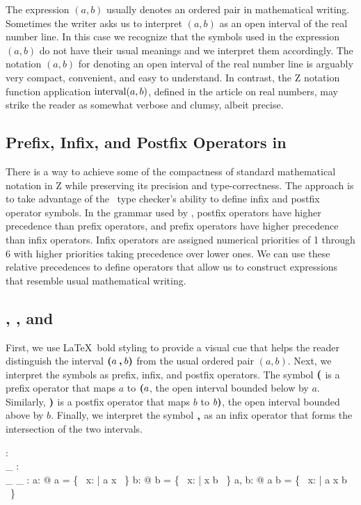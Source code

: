 \documentclass[11pt, oneside]{article}
\begin{document}
The expression $(a,b)$ usually denotes an ordered pair in mathematical writing.
Sometimes the writer asks us to interpret $(a,b)$ as an open interval of the real number line.
In this case we recognize that the symbols used in the expression $(a,b)$ do not have their usual meanings
and we interpret them accordingly.
The notation $(a,b)$ for denoting an open interval of the real number line is
arguably very compact, convenient, and easy to understand. 
In contrast, the Z notation function application $\operatorname{interval}(a,b)$, defined in the article on real numbers, 
may strike the reader as somewhat verbose and clumsy, albeit precise.

\subsection{Prefix, Infix, and Postfix Operators in \fuzz}

There is a way to achieve some of the compactness of standard mathematical notation in Z while
preserving its precision and type-correctness.
The approach is to take advantage of the \fuzz\ type checker's ability to define infix and postfix 
operator symbols. 
In the grammar used by \fuzz, postfix operators have higher precedence than prefix operators,
and prefix operators have higher precedence than infix operators.
Infix operators are assigned numerical priorities of 1 through 6 with higher priorities taking precedence 
over lower ones.
We can use these relative precedences to define operators that allow us to construct expressions 
that resemble usual mathematical writing.

\subsection{, , and }

First, we use \LaTeX\ bold styling to provide a visual cue that helps the reader
distinguish the interval $\boldsymbol{(} a \mathbin{\boldsymbol{,}} b \boldsymbol{)}$ from the
usual ordered pair $(a,b)$.
Next, we interpret the symbols as prefix, infix, and postfix operators.
The symbol $\boldsymbol{(}$ is a prefix operator that maps $a$ to $\boldsymbol{(} a$, 
the open interval bounded below by $a$.
Similarly, $\boldsymbol{)}$ is a postfix operator that maps $b$ to $b \boldsymbol{)}$, 
the open interval bounded above by $b$.
Finally, we interpret the symbol $\mathbin{\boldsymbol{,}}$ as an infix operator that forms the intersection of the two intervals.

\begin{axdef}
	\lowerBound: \R \fun \power \R \\
	\_ \upperBound: \R \fun \power \R \\
	\_ \intersect \_ : \power \R \cross \power \R \fun \power \R
\where
	\forall a: \R @ \lowerBound a = \{~ x: \R | a \ltR x ~\}
\also
	\forall b: \R @ b \upperBound = \{~ x: \R | x \ltR b ~\}
\also
	\forall a, b: \R @ \lowerBound a \intersect b \upperBound = \{~ x: \R | a \ltR x \ltR b ~\}
\end{axdef}
\end{document}
